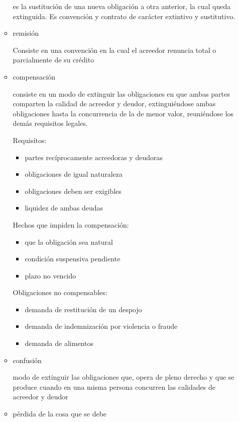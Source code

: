 \documentclass[]{article}
\providecommand{\tightlist}{%
  \setlength{\itemsep}{0pt}\setlength{\parskip}{0pt}}
\begin{document}
\begin{itemize}
\begin{itemize}
    es la sustitución de una nueva obligación a otra anterior, la cual
    queda extinguida. Es convención y contrato de carácter extintivo y
    sustitutivo.
  \item
    remisión

    Consiste en una convención en la cual el acreedor renuncia total o
    parcialmente de su crédito
  \item
    compensación

    consiste en un modo de extinguir las obligaciones en que ambas
    partes comparten la calidad de acreedor y deudor, extinguiéndose
    ambas obligaciones hasta la concurrencia de la de menor valor,
    reuniéndose los demás requisitos legales.

    Requisitos:

    \begin{itemize}
    \tightlist
    \item
      partes recíprocamente acreedoras y deudoras
    \item
      obligaciones de igual naturaleza
    \item
      obligaciones deben ser exigibles
    \item
      liquidez de ambas deudas
    \end{itemize}

    Hechos que impiden la compensación:

    \begin{itemize}
    \tightlist
    \item
      que la obligación sea natural
    \item
      condición suspensiva pendiente
    \item
      plazo no vencido
    \end{itemize}

    Obligaciones no compensables:

    \begin{itemize}
    \tightlist
    \item
      demanda de restitución de un despojo
    \item
      demanda de indemnización por violencia o fraude
    \item
      demanda de alimentos
    \end{itemize}
  \item
    confusión

    modo de extinguir las obligaciones que, opera de pleno derecho y que
    se produce cuando en una misma persona concurren las calidades de
    acreedor y deudor
  \item
    pérdida de la cosa que se debe


\end{itemize}
\end{itemize}
\end{document}
